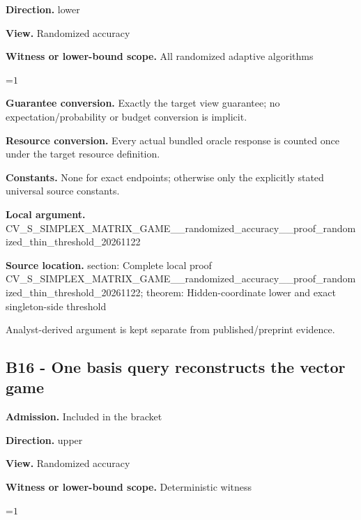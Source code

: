 \documentclass[10pt,a4paper]{article}
\newcommand{\AtlasMath}[1]{\par\begingroup\centering\setbox0=\hbox{$\displaystyle #1$}\ifdim\wd0>1.4\linewidth\typeout{ATLAS WIDE FORMULA: \the\wd0}\fi\ifdim\wd0>\linewidth\resizebox{\linewidth}{!}{\box0}\else\box0\fi\par\endgroup}
\begin{document}
\textbf{Direction.} lower



\textbf{View.} Randomized accuracy



\textbf{Witness or lower-bound scope.} All randomized adaptive algorithms



\AtlasMath{1}


\textbf{Guarantee conversion.} Exactly the target view guarantee; no expectation/probability or budget conversion is implicit.



\textbf{Resource conversion.} Every actual bundled oracle response is counted once under the target resource definition.



\textbf{Constants.} None for exact endpoints; otherwise only the explicitly stated universal source constants.



\textbf{Local argument.} CV\_S\_SIMPLEX\_MATRIX\_GAME\allowbreak{}\_\_randomized\_accuracy\_\_p\allowbreak{}roof\_randomized\_thin\_thr\allowbreak{}eshold\_20261122



\textbf{Source location.}  section: Complete local proof CV\_S\_SIMPLEX\_MATRIX\_GAME\allowbreak{}\_\_randomized\_accuracy\_\_p\allowbreak{}roof\_randomized\_thin\_thr\allowbreak{}eshold\_20261122; theorem: Hidden-coordinate lower and exact singleton-side threshold



Analyst-derived argument is kept separate from published/preprint evidence.



\subsection{B16 - One basis query reconstructs the vector game}


\textbf{Admission.} Included in the bracket



\textbf{Direction.} upper



\textbf{View.} Randomized accuracy



\textbf{Witness or lower-bound scope.} Deterministic witness



\AtlasMath{1}
\end{document}
